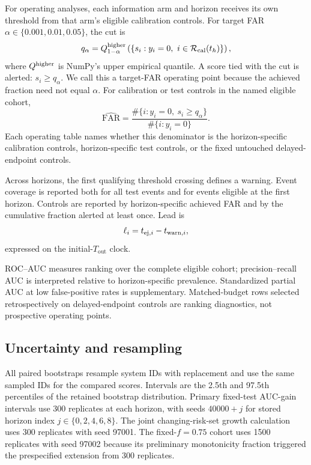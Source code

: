 \documentclass[linenumbers,twocolumn]{aastex702}
\newcommand{\Tout}{T_{\mathrm{out}}}
\begin{document}
For operating analyses, each information arm and horizon receives its own threshold from that arm's eligible calibration controls. For target FAR $\alpha\in\{0.001,0.01,0.05\}$, the cut is
\begin{equation}
 q_{\alpha}=Q^{\rm higher}_{1-\alpha}
 \left(\{s_i:y_i=0,\ i\in\mathcal{R}_{\rm cal}(t_h)\}\right),
\end{equation}
where $Q^{\rm higher}$ is NumPy's upper empirical quantile. A score tied with the cut is alerted: $s_i\ge q_\alpha$. We call this a target-FAR operating point because the achieved fraction need not equal $\alpha$. For calibration or test controls in the named eligible cohort,
\begin{equation}
 \widehat{\mathrm{FAR}}=
 \frac{\#\{i:y_i=0,\ s_i\ge q_\alpha\}}
 {\#\{i:y_i=0\}}.
\end{equation}
Each operating table names whether this denominator is the horizon-specific calibration controls, horizon-specific test controls, or the fixed untouched delayed-endpoint controls.

Across horizons, the first qualifying threshold crossing defines a warning. Event coverage is reported both for all test events and for events eligible at the first horizon. Controls are reported by horizon-specific achieved FAR and by the cumulative fraction alerted at least once. Lead is
\begin{equation}
  \ell_i=t_{{\rm ej},i}-t_{{\rm warn},i},
\end{equation}
expressed on the initial-$\Tout$ clock.

ROC--AUC measures ranking over the complete eligible cohort; precision--recall AUC is interpreted relative to horizon-specific prevalence. Standardized partial AUC at low false-positive rates is supplementary. Matched-budget rows selected retrospectively on delayed-endpoint controls are ranking diagnostics, not prospective operating points.

\subsection{Uncertainty and resampling}\label{sec:uncertainty}

All paired bootstraps resample system IDs with replacement and use the same sampled IDs for the compared scores. Intervals are the 2.5th and 97.5th percentiles of the retained bootstrap distribution. Primary fixed-test AUC-gain intervals use 300 replicates at each horizon, with seeds $40000+j$ for stored horizon index $j\in\{0,2,4,6,8\}$. The joint changing-risk-set growth calculation uses 300 replicates with seed 97001. The fixed-$f=0.75$ cohort uses 1500 replicates with seed 97002 because its preliminary monotonicity fraction triggered the prespecified extension from 300 replicates.
\end{document}
